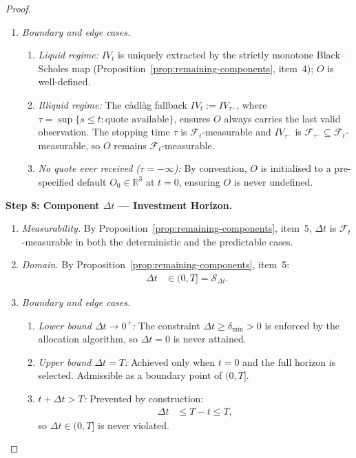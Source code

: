 \documentclass[12pt,openany]{book}
\newcommand{\calF}{\mathcal{F}}
\numberwithin{equation}{chapter}
\theoremstyle{plain}
\theoremstyle{definition}
\theoremstyle{remark}
\numberwithin{equation}{chapter}
\theoremstyle{plain}
\begin{document}
\begin{proof}
\begin{enumerate}
  \item \emph{Boundary and edge cases.}
    \begin{enumerate}
      \item \emph{Liquid regime:}
        $IV_t$ is uniquely extracted by the strictly monotone
        Black--Scholes map (Proposition~\ref{prop:remaining-components},
        item~4); $O$ is well-defined.
      \item \emph{Illiquid regime:}
        The càdlàg fallback
        $IV_t := IV_{\tau^-}$, where
        $\tau = \sup\{s \leq t : \text{quote available}\}$,
        ensures $O$ always carries the last valid observation.
        The stopping time $\tau$ is $\calF_t$-measurable
        and $IV_{\tau^-}$ is $\calF_{\tau^-}
        \subseteq \calF_t$-measurable, so $O$ remains
        $\calF_t$-measurable.
      \item \emph{No quote ever received ($\tau = -\infty$):}
        By convention, $O$ is initialised to a pre-specified
        default $O_0 \in \mathbb{R}^3$ at $t = 0$, ensuring
        $O$ is never undefined.
    \end{enumerate}
\end{enumerate}

\medskip
\noindent\textbf{Step 8: Component $\Delta t$ —
Investment Horizon.}
\begin{enumerate}
  \item \emph{Measurability.}
    By Proposition~\ref{prop:remaining-components}, item~5,
    $\Delta t$ is $\calF_t$-measurable in both the
    deterministic and the predictable cases.

  \item \emph{Domain.}
    By Proposition~\ref{prop:remaining-components}, item~5:
    \begin{align}
      \Delta t
        &\in (0, T]
         = \mathcal{S}_{\Delta t}.
    \end{align}

  \item \emph{Boundary and edge cases.}
    \begin{enumerate}
      \item \emph{Lower bound $\Delta t \to 0^+$:}
        The constraint $\Delta t \geq \delta_{\min} > 0$
        is enforced by the allocation algorithm, so
        $\Delta t = 0$ is never attained.
      \item \emph{Upper bound $\Delta t = T$:}
        Achieved only when $t = 0$ and the full horizon is
        selected.  Admissible as a boundary point of $(0,T]$.
      \item \emph{$t + \Delta t > T$:}
        Prevented by construction:
        \begin{align}
          \Delta t
            &\leq T - t
             \leq T,
        \end{align}
        so $\Delta t \in (0, T]$ is never violated.
    \end{enumerate}
\end{enumerate}


\end{proof}
\end{document}
